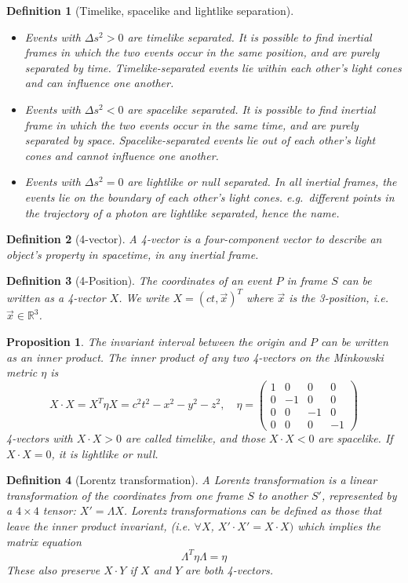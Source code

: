 \documentclass[a4paper]{article}
\theoremstyle{new}
\newtheorem{defi}{Definition}[section]
\newtheorem{prop}{Proposition}[section]
\begin{document}
\begin{defi}[Timelike, spacelike and lightlike separation]\leavevmode
\begin{itemize}
  \item Events with $\Delta s^2 > 0$ are timelike separated. It is possible to find inertial frames in which the two events occur in the same position, and are purely separated by time. Timelike-separated events lie within each other's light cones and can influence one another.
  \item Events with $\Delta s^2 < 0$ are spacelike separated. It is possible to find inertial frame in which the two events occur in the same time, and are purely separated by space. Spacelike-separated events lie out of each other's light cones and cannot influence one another.
  \item Events with $\Delta s^2 = 0$ are lightlike or null separated. In all inertial frames, the events lie on the boundary of each other's light cones. e.g.\ different points in the trajectory of a photon are lightlike separated, hence the name.
\end{itemize}
\end{defi}
\begin{defi}[4-vector]
  A 4-vector is a four-component vector to describe an object's property in spacetime, in any inertial frame.
\end{defi}
\begin{defi}[4-Position]
The coordinates of an event $P$ in frame $S$ can be written as a 4-vector $X$. We write $X=(ct,\vec{x})^T$ where $\vec{x}$ is the 3-position, i.e. $\vec{x}\in\mathbb{R}^3$.
\end{defi}
\begin{prop}
The invariant interval between the origin and $P$ can be written as an inner product. The inner product of any two 4-vectors on the Minkowski metric $\eta$ is
$$X\cdot X = X^T\eta X = c^2t^2 - x^2 - y^2 - z^2,\quad\eta =
  \begin{pmatrix}
    1 & 0 & 0 & 0\\
    0 & -1 & 0 & 0\\
    0 & 0 & -1 & 0\\
    0 & 0 & 0 & -1
  \end{pmatrix}$$
4-vectors with $X\cdot X > 0$ are called timelike, and those $X \cdot X < 0$ are spacelike. If $X\cdot X = 0$, it is lightlike or null.
\end{prop}
\begin{defi}[Lorentz transformation]
A Lorentz transformation is a linear transformation of the coordinates from one frame $S$ to another $S'$, represented by a $4\times 4$ tensor: $X' = \Lambda X$. Lorentz transformations can be defined as those that leave the inner product invariant, (i.e. $\forall X$, $X'\cdot X' = X\cdot X)$ which implies the matrix equation
$$\Lambda^T\eta \Lambda = \eta$$
These also preserve $X\cdot Y$ if $X$ and $Y$ are both 4-vectors.
\end{defi}
\end{document}
